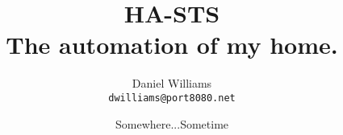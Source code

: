 \documentclass[letterpaper,twoside,12pt]{book}
\title{HA-STS \\ The automation of my home.}
\author{Daniel Williams \\ \texttt{dwilliams@port8080.net}}
\date{Somewhere...Sometime}
\begin{document}
\maketitle


\tableofcontents




















\appendix


%

\printglossaries

\end{document}
